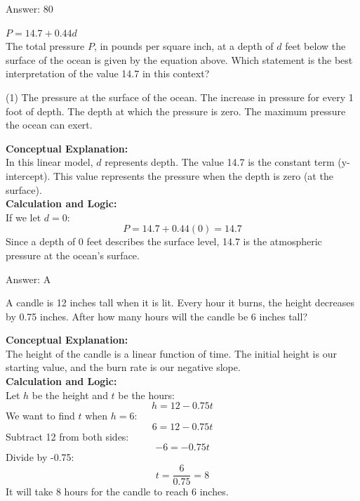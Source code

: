 \documentclass[11pt,paper=a4,answers]{exam}
\begin{document}
\begin{questions}
\begin{solution}
\vspace{15pt}
Answer: \colorbox{yellow!100}{80}
\end{solution}

\question
$P = 14.7 + 0.44d$ \\
The total pressure $P$, in pounds per square inch, at a depth of $d$ feet below the surface of the ocean is given by the equation above. Which statement is the best interpretation of the value 14.7 in this context?
\begin{tasks}(1)
    \task The pressure at the surface of the ocean.
    \task The increase in pressure for every 1 foot of depth.
    \task The depth at which the pressure is zero.
    \task The maximum pressure the ocean can exert.
\end{tasks}

\begin{solution}
\textbf{Conceptual Explanation:} \\
In this linear model, $d$ represents depth. The value 14.7 is the constant term (y-intercept). This value represents the pressure when the depth is zero (at the surface).
\\[10pt]
\textbf{Calculation and Logic:} \\
If we let $d = 0$:
\[P = 14.7 + 0.44(0) = 14.7\]
Since a depth of 0 feet describes the surface level, 14.7 is the atmospheric pressure at the ocean's surface.

\vspace{15pt}
Answer: \colorbox{yellow!100}{A}
\end{solution}



\question
A candle is 12 inches tall when it is lit. Every hour it burns, the height decreases by 0.75 inches. After how many hours will the candle be 6 inches tall?

\begin{solution}
\textbf{Conceptual Explanation:} \\
The height of the candle is a linear function of time. The initial height is our starting value, and the burn rate is our negative slope.
\\[10pt]
\textbf{Calculation and Logic:} \\
Let $h$ be the height and $t$ be the hours:
\[h = 12 - 0.75t\]
We want to find $t$ when $h = 6$:
\[6 = 12 - 0.75t\]
Subtract 12 from both sides:
\[-6 = -0.75t\]
Divide by -0.75:
\[t = \frac{6}{0.75} = 8\]
It will take 8 hours for the candle to reach 6 inches.


\end{solution}
\end{questions}
\end{document}
